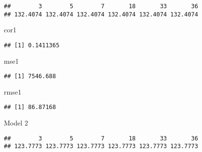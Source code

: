 \documentclass[
]{article}
\newenvironment{Shaded}{\begin{snugshade}}{\end{snugshade}}
\newcommand{\AttributeTok}[1]{\textcolor[rgb]{0.77,0.63,0.00}{#1}}
\newcommand{\DecValTok}[1]{\textcolor[rgb]{0.00,0.00,0.81}{#1}}
\newcommand{\FunctionTok}[1]{\textcolor[rgb]{0.00,0.00,0.00}{#1}}
\newcommand{\NormalTok}[1]{#1}
\newcommand{\OtherTok}[1]{\textcolor[rgb]{0.56,0.35,0.01}{#1}}
\newcommand{\SpecialCharTok}[1]{\textcolor[rgb]{0.00,0.00,0.00}{#1}}
\begin{document}
\begin{verbatim}
##        3        5        7       18       33       36 
## 132.4074 132.4074 132.4074 132.4074 132.4074 132.4074
\end{verbatim}

\begin{Shaded}
\begin{Highlighting}[]
\NormalTok{cor1}
\end{Highlighting}
\end{Shaded}

\begin{verbatim}
## [1] 0.1411365
\end{verbatim}

\begin{Shaded}
\begin{Highlighting}[]
\NormalTok{mse1}
\end{Highlighting}
\end{Shaded}

\begin{verbatim}
## [1] 7546.688
\end{verbatim}

\begin{Shaded}
\begin{Highlighting}[]
\NormalTok{rmse1}
\end{Highlighting}
\end{Shaded}

\begin{verbatim}
## [1] 86.87168
\end{verbatim}

Model 2

\begin{Shaded}
\end{Shaded}

\begin{verbatim}
##        3        5        7       18       33       36 
## 123.7773 123.7773 123.7773 123.7773 123.7773 123.7773
\end{verbatim}
\end{document}
